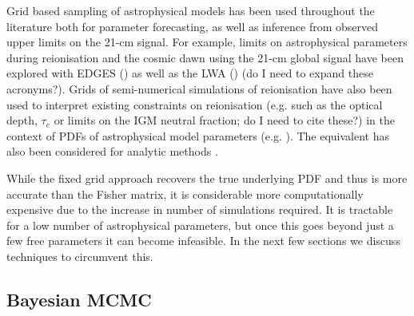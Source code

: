 Grid based sampling of astrophysical models has been used throughout the literature both for parameter forecasting, as well as inference from observed upper limits on the 21-cm signal. For example, limits on astrophysical parameters during reionisation and the cosmic dawn using the 21-cm global signal have been explored with EDGES (\cite{Monsalve:2017,Monsalve:2018,Monsalve:2019}) as well as the LWA (\cite{Fialkov:2019b}) {\color{red} (do I need to expand these acronyms?)}. Grids of semi-numerical simulations of reionisation have also been used to interpret existing constraints on reionisation (e.g. such as the optical depth, $\tau_{e}$ or limits on the IGM neutral fraction; {\color{red} do I need to cite these?}) in the context of PDFs of astrophysical model parameters (e.g. \cite{Mesinger:2012,Mesinger:2013,Greig:2017a}). The equivalent has also been considered for analytic methods \cite{Choudhury:2005,Barkana:2009,Zahn:2012,Mirocha:2018}.

While the fixed grid approach recovers the true underlying PDF and thus is more accurate than the Fisher matrix, it is considerable more computationally expensive due to the increase in number of simulations required. It is tractable for a low number of astrophysical parameters, but once this goes beyond just a few free parameters it can become infeasible. In the next few sections we discuss techniques to circumvent this.

\subsection{Bayesian MCMC} \label{sec:MCMC}

